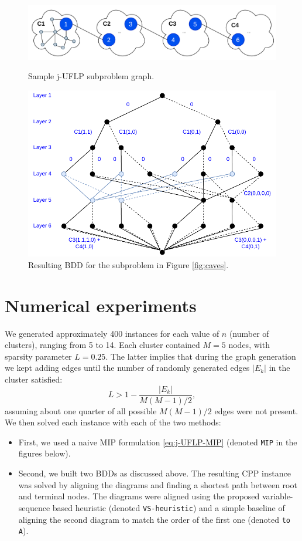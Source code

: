 \documentclass[11pt]{article}
\begin{document}
  \begin{figure}%
    \centering
    \includegraphics[width=\textwidth]{./caves.pdf}%
    \caption{Sample j-UFLP subproblem graph.\label{fig:caves}}
    \vspace{2em}
    \includegraphics[width=\textwidth]{./dcloud-DD.pdf}%
    \caption{Resulting BDD for the subproblem in Figure \ref{fig:caves}.\label{fig:dcloud-DD}}
\end{figure}

\section{Numerical experiments}
\label{sec:j-UFLP-nums}
We generated approximately 400 instances for each value of \(n\) (number of
clusters), ranging from 5 to 14. Each cluster contained \(M=5\) nodes, with
sparsity parameter \(L=0.25\). The latter implies that during the graph generation
we kept adding edges until the number of randomly generated edges \(|E_k|\) in the
cluster satisfied: $$L > 1 - \frac{|E_k|}{M(M-1) / 2},$$ assuming about one
quarter of all possible \(M(M-1)/2\) edges were not present. We then solved each
instance with each of the two methods:
\begin{itemize}
\item First, we used a naive MIP formulation \eqref{eq:j-UFLP-MIP} (denoted \texttt{MIP} in
the figures below).
\item Second, we built two BDDs as discussed above. The resulting CPP instance was
solved by aligning the diagrams and finding a shortest path between root and
terminal nodes. The diagrams were aligned using the proposed variable-sequence
based heuristic (denoted \texttt{VS-heuristic}) and a simple baseline of aligning the
second diagram to match the order of the first one (denoted \texttt{to A}).
\end{itemize}
\end{document}
